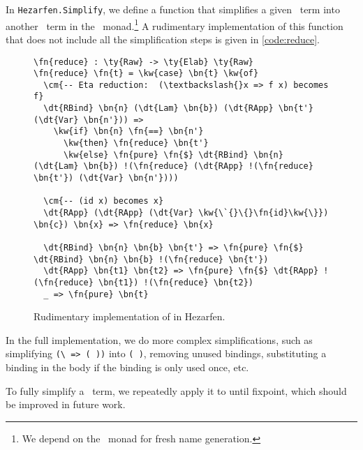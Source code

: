 In \texttt{Hezarfen.Simplify}, we define a function  that simplifies
a given \Raw\ term into another \Raw\ term in the \Elab\ monad.\footnote{We
depend on the \Elab\ monad for fresh name generation.}
A rudimentary implementation of this function that does not include all the
simplification steps is given in \autoref{code:reduce}.

\begin{figure}[ht]
\caption{Rudimentary implementation of  in Hezarfen.}
\begin{Verbatim}[framesep=2mm, label=\footnotesize{\normalfont{Idris}}, labelposition=topline]
\fn{reduce} : \ty{Raw} -> \ty{Elab} \ty{Raw}
\fn{reduce} \fn{t} = \kw{case} \bn{t} \kw{of}
  \cm{-- Eta reduction:  (\textbackslash{}x => f x) becomes f}
  \dt{RBind} \bn{n} (\dt{Lam} \bn{b}) (\dt{RApp} \bn{t'} (\dt{Var} \bn{n'})) =>
    \kw{if} \bn{n} \fn{==} \bn{n'}
      \kw{then} \fn{reduce} \bn{t'}
      \kw{else} \fn{pure} \fn{$} \dt{RBind} \bn{n} (\dt{Lam} \bn{b}) !(\fn{reduce} (\dt{RApp} !(\fn{reduce} \bn{t'}) (\dt{Var} \bn{n'})))

  \cm{-- (id x) becomes x}
  \dt{RApp} (\dt{RApp} (\dt{Var} \kw{\`{}\{}\fn{id}\kw{\}}) \bn{c}) \bn{x} => \fn{reduce} \bn{x}

  \dt{RBind} \bn{n} \bn{b} \bn{t'} => \fn{pure} \fn{$} \dt{RBind} \bn{n} \bn{b} !(\fn{reduce} \bn{t'})
  \dt{RApp} \bn{t1} \bn{t2} => \fn{pure} \fn{$} \dt{RApp} !(\fn{reduce} \bn{t1}) !(\fn{reduce} \bn{t2})
  _ => \fn{pure} \bn{t}
\end{Verbatim}
\end{figure}

In the full implementation, we do more complex simplifications, such as
simplifying \texttt{(\textbackslash{} =>  ( ))} into
\texttt{(  )}, removing unused  bindings,
substituting a  binding in the body if the binding is only used once,
etc.

To fully simplify a \Raw\ term, we repeatedly apply it to  until
fixpoint, which should be improved in future work.
